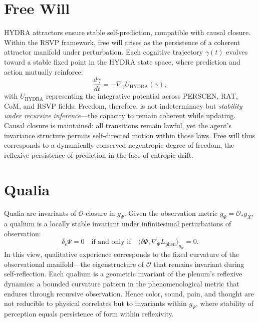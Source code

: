 \documentclass[12pt]{book}
\theoremstyle{definition}
\begin{document}
\section{Free Will}
HYDRA attractors ensure stable self-prediction, compatible with causal closure.
Within the RSVP framework, free will arises as the persistence of a coherent attractor manifold under perturbation.  
Each cognitive trajectory $\gamma(t)$ evolves toward a stable fixed point in the HYDRA state space, where prediction and action mutually reinforce:
\begin{equation}
\frac{d\gamma}{dt} = -\nabla_\gamma U_{\text{HYDRA}}(\gamma),
\end{equation}
with $U_{\text{HYDRA}}$ representing the integrative potential across PERSCEN, RAT, CoM, and RSVP fields.  
Freedom, therefore, is not indeterminacy but \emph{stability under recursive inference}---the capacity to remain coherent while updating.  
Causal closure is maintained: all transitions remain lawful, yet the agent’s invariance structure permits self-directed motion within those laws.  
Free will thus corresponds to a dynamically conserved negentropic degree of freedom, the reflexive persistence of prediction in the face of entropic drift.

\section{Qualia}
Qualia are invariants of $\mathcal{O}$-closure in $g_\Psi$.
Given the observation metric $g_\Psi = \mathcal{O}_* g_X$, a qualium is a locally stable invariant under infinitesimal perturbations of observation:
\begin{equation}
\delta_\epsilon \Psi = 0 \quad \text{if and only if} \quad 
\langle \delta \Psi, \nabla_\Psi L_{\text{phen}} \rangle_{g_\Psi} = 0.
\end{equation}
In this view, qualitative experience corresponds to the fixed curvature of the observational manifold—the eigenstructure of $\mathcal{O}$ that remains invariant during self-reflection.  
Each qualium is a geometric invariant of the plenum’s reflexive dynamics: a bounded curvature pattern in the phenomenological metric that endures through recursive observation.  
Hence color, sound, pain, and thought are not reducible to physical correlates but to invariants within $g_\Psi$, where stability of perception equals persistence of form within reflexivity.
\end{document}
